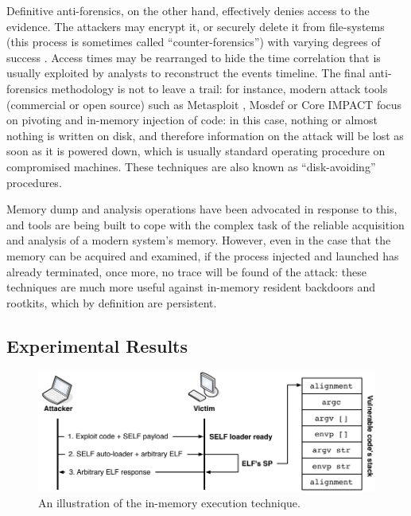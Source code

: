 Definitive anti-forensics, on the other hand, effectively denies access to the evidence. The attackers may encrypt it, or securely delete it from file-systems (this process is sometimes called ``counter-forensics'') with varying degrees of success \citep{counterfor,garfinkel2003rdp}. Access times may be rearranged to hide the time correlation that is usually exploited by analysts to reconstruct the events timeline. The final anti-forensics methodology is not to leave a trail: for instance, modern attack tools (commercial or open source) such as \textsf{Metasploit} \citep{mafia}, \textsf{Mosdef} or \textsf{Core IMPACT} \citep{coreimpact} focus on pivoting and in-memory injection of code: in this case, nothing or almost nothing is written on disk, and therefore information on the attack will be lost as soon as it is powered down, which is usually standard operating procedure on compromised machines. These techniques are also known as ``disk-avoiding'' procedures.

Memory dump and analysis operations have been advocated in response to this, and tools are being built to cope with the complex task of the reliable acquisition \citep{burdach,body} and analysis \citep{burdach,ring2004vmc,fatkit} of a modern system's memory. However, even in the case that the memory can be acquired and examined, if the process injected and launched has already terminated, once more, no trace will be found of the attack: these techniques are much more useful against in-memory resident backdoors and rootkits, which by definition are persistent.

\subsection{Experimental Results}
\label{host:forensics:setup}

\begin{figure}[t]
 \centering
 \includegraphics[width=\textwidth]{figures/host/forensics/self_new}
 \caption{An illustration of the in-memory execution technique.}
 \label{fig:self}
\end{figure}

